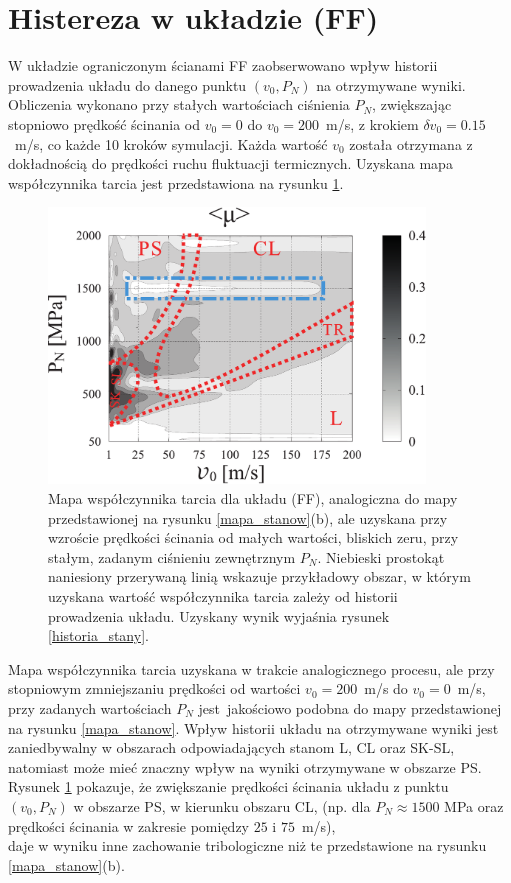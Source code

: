 \documentclass[12pt,a4paper,openright]{report} %
\begin{document}
\section{Histereza w układzie (FF)}
%
%
W układzie ograniczonym ścianami FF zaobserwowano wpływ historii prowadzenia układu do danego punktu $(v_0, P_N)$ na otrzymywane wyniki. Obliczenia wykonano przy stałych wartościach ciśnienia $P_N$, zwiększając stopniowo prędkość ścinania od $v_0=0$ do $v_0=200$~m/s, z krokiem $\delta v_0 = 0.15$~m/s, co każde 10 kroków symulacji. Każda wartość $v_0$ została otrzymana z dokładnością do prędkości ruchu fluktuacji termicznych. Uzyskana mapa współczynnika tarcia jest przedstawiona na rysunku \ref{mapa_historia}. 
\begin{figure}[h]
\centering
\includegraphics[width=100mm]{rysunki/PRE16_fig11.pdf}
\caption{Mapa współczynnika tarcia dla układu (FF), analogiczna do mapy przedstawionej na rysunku \ref{mapa_stanow}(b), ale uzyskana przy wzroście prędkości ścinania od małych wartości, bliskich zeru, przy stałym, zadanym ciśnieniu zewnętrznym $P_N$. Niebieski prostokąt naniesiony przerywaną linią wskazuje przykładowy obszar, w którym uzyskana wartość współczynnika tarcia zależy od historii prowadzenia układu. Uzyskany wynik wyjaśnia rysunek \ref{historia_stany}.}
\label{mapa_historia}
\end{figure}
Mapa współczynnika tarcia uzyskana w trakcie analogicznego procesu, ale przy stopniowym zmniejszaniu prędkości od wartości $v_0=200$~m/s do $v_0=0$~m/s, przy zadanych wartościach $P_N$ jest~jakościowo podobna do mapy przedstawionej na rysunku \ref{mapa_stanow}. Wpływ historii układu na otrzymywane wyniki jest zaniedbywalny w obszarach odpowiadających stanom L, CL oraz SK-SL, natomiast może mieć znaczny wpływ na wyniki otrzymywane w obszarze PS.
%
Rysunek \ref{mapa_historia} pokazuje, że zwiększanie prędkości ścinania układu z punktu $(v_0, P_N)$ w obszarze PS, w kierunku obszaru CL, (np. dla $P_N \approx 1500$ MPa oraz prędkości ścinania w zakresie pomiędzy $25$ i $75$~m/s), \\daje w wyniku inne zachowanie tribologiczne niż te przedstawione na rysunku \ref{mapa_stanow}(b). 
\end{document}
